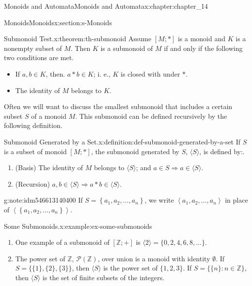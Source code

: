 \documentclass[oneside,10pt,]{book}
\numberwithin{equation}{section}
\begin{document}
\begin{chapterptx}{Monoids and Automata}{}{Monoids and Automata}{}{}{x:chapter:chapter_14}
\begin{sectionptx}{Monoids}{}{Monoids}{}{}{x:section:s-Monoids}
\begin{theorem}{Submonoid Test.}{}{x:theorem:th-submonoid}%
Assume \([M; *]\)  is a monoid and \(K\) is a nonempty subset of \(M\). Then \(K\) is a submonoid of \(M\) if and only if the following two conditions are met.%
\begin{itemize}[label=\textbullet]
\item{}If \(a,b\in K\), then.  \(a*b\in K\); i. e., \(K\)  is closed with under \(*\).%
\item{}The identity of \(M\) belongs to \(K\).%
\end{itemize}
%
\end{theorem}
Often we will want to discuss the smallest submonoid that includes a certain subset \(S\) of a monoid \(M\). This submonoid can be defined recursively by the following definition.%
\begin{definition}{Submonoid Generated by a Set.}{x:definition:def-submonoid-generated-by-a-set}%
%
If \(S\) is a subset of monoid \([M;*]\), the submonoid generated by \(S\), \(\langle S\rangle\), is defined by:.%
\begin{enumerate}[label=(\alph*)]
\item{}(Basis) The identity of \(M\) belongs to \(\langle
S\rangle\); and \(a\in S \Rightarrow a\in \langle S \rangle\).%
\item{}(Recursion) \(a,b\in \langle S\rangle \Rightarrow a*b\in \langle S\rangle\).%
\end{enumerate}
%
\end{definition}
\begin{note}{}{g:note:idm546613140400}%
If \(S=\left\{a_1,a_2,\ldots ,a_n\right\}\), we write \(\left\langle a_1,a_2,\ldots ,a_n\right\rangle\) in place of \(\left\langle \left\{a_1,a_2,\ldots
,a_n\right\}\right\rangle\).%
\end{note}
\begin{example}{Some Submonoids.}{x:example:ex-some-submonoids}%
%
\begin{enumerate}[label=(\alph*)]
\item{}One example of a submonoid of \([\mathbb{Z};+]\) is \(\langle 2\rangle =\{0,2,4,6,8,\ldots \}\).%
\item{}The power set of \(\mathbb{Z}\), \(\mathcal{P}(\mathbb{Z})\), over union is a monoid with identity \(\emptyset\). If \(S=\{\{1\},\{2\},\{3\}\}\), then \(\langle S \rangle\) is the power set of \(\{1,2,3\}\). If \(S=\{\{n\}:n\in \mathbb{Z}\},\) then \(\langle S\rangle\) is the set of finite subsets of the integers.%

\end{enumerate}
\end{example}
\end{sectionptx}
\end{chapterptx}
\end{document}

